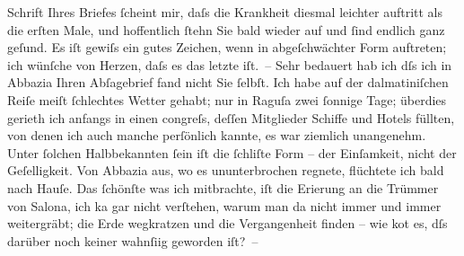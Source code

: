                Schrift Ihres Briefes ſcheint mir, daſs die Krankheit diesmal leichter auftritt als
               die erſten Male, und hoffentlich ſtehn Sie bald wieder auf und ſind endlich ganz
               geſund. Es iſt gewiſs ein gutes Zeichen, wenn \label{K_L01034-2v}\label{K_L01034-2} in abgeſchwächter Form auftreten; {\pb}ich wünſche von Herzen, daſs es das letzte iſt. –
               Sehr bedauert hab ich dſs ich in Abbazia Ihren
               Abſagebrief fand nicht Sie ſelbſt. Ich habe auf der dalmatiniſchen Reiſe meiſt ſchlechtes Wetter gehabt; nur in Raguſa zwei ſonnige Tage; überdies gerieth ich
               anfangs in einen \label{K_L01034-3v}\label{K_L01034-3}congreſs, deſſen Mitglieder Schiffe und Hotels füllten, von
               denen ich auch manche perſönlich kannte, es war ziemlich unangenehm. Unter ſolchen
                  Halb{\pb}bekannten ſein iſt die ſchli{\geminationm}ſte Form – der Einſamkeit, nicht der Geſelligkeit. Von
                  Abbazia aus, wo es ununterbrochen regnete,
               flüchtete ich bald nach Hauſe. Das ſchönſte was ich mitbrachte, iſt die Eri{\geminationn}erung an die Trümmer von Salona, ich ka{\geminationn} gar nicht verſtehen, warum man
               da nicht immer und immer weitergräbt; die Erde wegkratzen und die Vergangenheit
               finden – wie ko{\geminationm}t es, dſs darüber noch keiner wahnſi{\geminationn}ig {\pb}geworden
               iſt? –\pend
           
